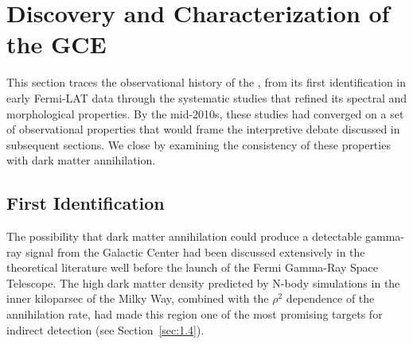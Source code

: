 
\section{Discovery and Characterization of the GCE}
\label{sec:4.1}

This section traces the observational history of the \GCE, from its first identification in early Fermi-LAT data through the systematic studies that refined its spectral and morphological properties.
By the mid-2010s, these studies had converged on a set of observational properties that would frame the interpretive debate discussed in subsequent sections.
We close by examining the consistency of these properties with dark matter annihilation.


\subsection{First Identification}
\label{sec:4.1.1}

The possibility that dark matter annihilation could produce a detectable gamma-ray signal from the Galactic Center had been discussed extensively in the theoretical literature well before the launch of the Fermi Gamma-Ray Space Telescope.
The high dark matter density predicted by N-body simulations in the inner kiloparsec of the Milky Way, combined with the $\rho^2$ dependence of the annihilation rate, had made this region one of the most promising targets for indirect detection (see Section~\ref{sec:1.4}).

